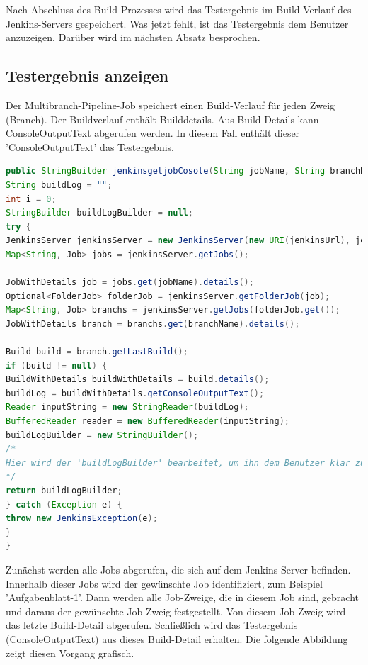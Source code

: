 \documentclass[a4paper,12pt,oneside]{book}
\begin{document}
Nach Abschluss des Build-Prozesses wird das Testergebnis im Build-Verlauf des Jenkins-Servers gespeichert. Was jetzt fehlt, ist das Testergebnis dem Benutzer anzuzeigen. Darüber wird im nächsten Absatz besprochen.
\subsection{Testergebnis anzeigen}
 Der Multibranch-Pipeline-Job speichert einen Build-Verlauf für jeden Zweig (Branch). Der Buildverlauf enthält Builddetails. Aus Build-Details kann ConsoleOutputText abgerufen werden. In diesem Fall enthält dieser 'ConsoleOutputText' das Testergebnis.
 \begin{lstlisting}[language=JAVA,caption=Testergebnis Anfrage ]
public StringBuilder jenkinsgetjobCosole(String jobName, String branchName ) throws JenkinsException {
String buildLog = "";
int i = 0;
StringBuilder buildLogBuilder = null;
try {
JenkinsServer jenkinsServer = new JenkinsServer(new URI(jenkinsUrl), jenkinsUser, jenkinsPassword);
Map<String, Job> jobs = jenkinsServer.getJobs();

JobWithDetails job = jobs.get(jobName).details();
Optional<FolderJob> folderJob = jenkinsServer.getFolderJob(job);
Map<String, Job> branchs = jenkinsServer.getJobs(folderJob.get());
JobWithDetails branch = branchs.get(branchName).details();

Build build = branch.getLastBuild();
if (build != null) {
BuildWithDetails buildWithDetails = build.details();
buildLog = buildWithDetails.getConsoleOutputText();
Reader inputString = new StringReader(buildLog);
BufferedReader reader = new BufferedReader(inputString);
buildLogBuilder = new StringBuilder();  
/*
Hier wird der 'buildLogBuilder' bearbeitet, um ihn dem Benutzer klar zu zeigen.
*/
return buildLogBuilder;
} catch (Exception e) {
throw new JenkinsException(e);
}
}
 \end{lstlisting}
 Zunächst werden alle Jobs abgerufen, die sich auf dem Jenkins-Server befinden. Innerhalb dieser Jobs wird der gewünschte Job identifiziert, zum Beispiel 'Aufgabenblatt-1'. Dann werden alle Job-Zweige, die in diesem Job sind, gebracht und daraus der gewünschte Job-Zweig festgestellt. Von diesem Job-Zweig wird das letzte Build-Detail abgerufen. Schließlich wird das Testergebnis (ConsoleOutputText) aus dieses Build-Detail erhalten. Die folgende Abbildung zeigt diesen Vorgang grafisch.
\end{document}
